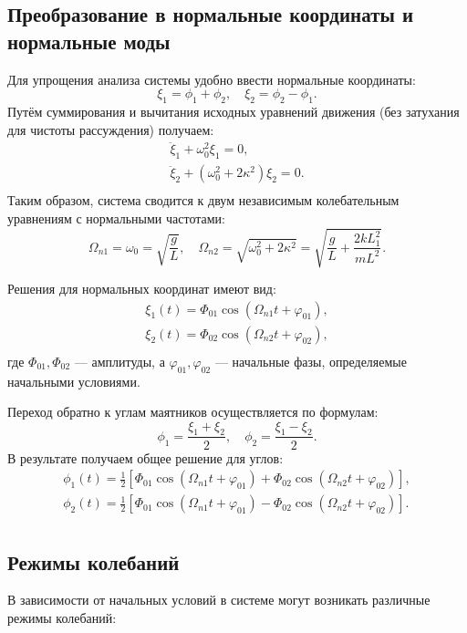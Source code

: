 \documentclass[a4paper,11pt]{article}
\theoremstyle{definition}
\begin{document}
\subsection*{Преобразование в нормальные координаты и нормальные моды}
Для упрощения анализа системы удобно ввести нормальные координаты:
\[
\xi_1 = \phi_1 + \phi_2, \quad \xi_2 = \phi_2 - \phi_1.
\]
Путём суммирования и вычитания исходных уравнений движения (без затухания для чистоты рассуждения) 
получаем:
\begin{gather*}
    \ddot{\xi}_1 + \omega_0^2 \xi_1 = 0,\\
    \ddot{\xi}_2 + \left(\omega_0^2 + 2\kappa^2\right) \xi_2 = 0.\\
\end{gather*}
Таким образом, система сводится к двум независимым колебательным уравнениям с нормальными частотами:
\[
\Omega_{n1} = \omega_0 = \sqrt{\frac{g}{L}}, \quad \Omega_{n2} = \sqrt{\omega_0^2 + 2\kappa^2} = \sqrt{\frac{g}{L} + \frac{2kL_1^2}{mL^2}}.
\]

Решения для нормальных координат имеют вид:
\begin{gather*}
    \xi_1(t) = \Phi_{01}\cos\left(\Omega_{n1}t+\varphi_{01}\right),\\
    \xi_2(t) = \Phi_{02}\cos\left(\Omega_{n2}t+\varphi_{02}\right),\\
\end{gather*}
где \(\Phi_{01}, \Phi_{02}\) --- амплитуды, а \(\varphi_{01}, \varphi_{02}\) --- начальные фазы, 
определяемые начальными условиями.

Переход обратно к углам маятников осуществляется по формулам:
\[
\phi_1 = \frac{\xi_1+\xi_2}{2}, \quad \phi_2 = \frac{\xi_1-\xi_2}{2}.
\]
В результате получаем общее решение для углов:
\begin{gather*}
    \phi_1(t) = \frac{1}{2}\left[\Phi_{01}\cos\left(\Omega_{n1}t+\varphi_{01}\right)+\Phi_{02}\cos\left(\Omega_{n2}t+\varphi_{02}\right)\right],\\
    \phi_2(t) = \frac{1}{2}\left[\Phi_{01}\cos\left(\Omega_{n1}t+\varphi_{01}\right)-\Phi_{02}\cos\left(\Omega_{n2}t+\varphi_{02}\right)\right].\\
\end{gather*}



\subsection*{Режимы колебаний}
В зависимости от начальных условий в системе могут возникать различные режимы колебаний:
\end{document}
